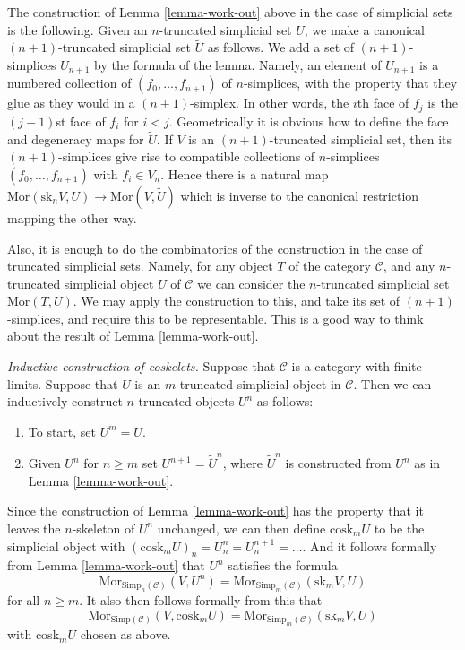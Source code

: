 \begin{remark}
\label{remark-cosk-simplicial-sets}
The construction of Lemma \ref{lemma-work-out}
above in the case of simplicial
sets is the following. Given an $n$-truncated simplicial
set $U$, we make a canonical $(n + 1)$-truncated simplicial
set $\tilde U$ as follows. We add a set of $(n + 1)$-simplices
$U_{n + 1}$ by the formula of the lemma. Namely,
an element of $U_{n + 1}$ is a numbered collection of
$(f_0,\ldots,f_{n + 1})$ of $n$-simplices,
with the property that they glue
as they would in a $(n + 1)$-simplex. In other words,
the $i$th face of $f_j$ is the $(j-1)$st face of $f_i$
for $i < j$. Geometrically it is obvious how to define the
face and degeneracy maps for $\tilde U$.
If $V$ is an $(n + 1)$-truncated simplicial set,
then its $(n + 1)$-simplices give rise to compatible collections
of $n$-simplices $(f_0, \ldots, f_{n + 1})$ with $f_i \in V_n$.
Hence there is a natural map
$\text{Mor}(\text{sk}_nV, U) \to \text{Mor}(V, \tilde U)$
which is inverse to the canonical restriction mapping
the other way.

\medskip\noindent
Also, it is enough to do the combinatorics of the
construction in the case of truncated simplicial sets.
Namely, for any object $T$ of the category $\mathcal{C}$,
and any $n$-truncated simplicial object $U$ of $\mathcal{C}$
we can consider the $n$-truncated simplicial set
$\text{Mor}(T, U)$. We may apply the construction to this,
and take its set of $(n + 1)$-simplices, and require this to be
representable. This is a good way to think about
the result of Lemma \ref{lemma-work-out}.
\end{remark}

\begin{remark}
\label{remark-inductive-coskelet}
{\it Inductive construction of coskelets.}
Suppose that $\mathcal{C}$ is a category with
finite limits. Suppose that $U$ is an $m$-truncated
simplicial object in $\mathcal{C}$. Then we can
inductively construct $n$-truncated objects $U^n$ as
follows:
\begin{enumerate}
\item To start, set $U^m = U$.
\item Given $U^n$ for $n \geq m$ set $U^{n + 1} = \tilde U^n$,
where $\tilde U^n$ is constructed from $U^n$ as in Lemma
\ref{lemma-work-out}.
\end{enumerate}
Since the construction of Lemma \ref{lemma-work-out} has
the property that it leaves the $n$-skeleton of $U^n$
unchanged, we can then define $\text{cosk}_m U$ to be
the simplicial object with
$(\text{cosk}_m U)_n = U^n_n = U^{n + 1}_n = \ldots$.
And it follows formally from Lemma \ref{lemma-work-out}
that $U^n$ satisfies the formula
$$
\text{Mor}_{\text{Simp}_n(\mathcal{C})}(V, U^n) 
=
\text{Mor}_{\text{Simp}_m(\mathcal{C})}(\text{sk}_mV, U)
$$
for all $n \geq m$. It also then follows formally 
from this that
$$
\text{Mor}_{\text{Simp}(\mathcal{C})}(V, \text{cosk}_mU) 
=
\text{Mor}_{\text{Simp}_m(\mathcal{C})}(\text{sk}_mV, U)
$$
with $\text{cosk}_mU$ chosen as above.
\end{remark}

